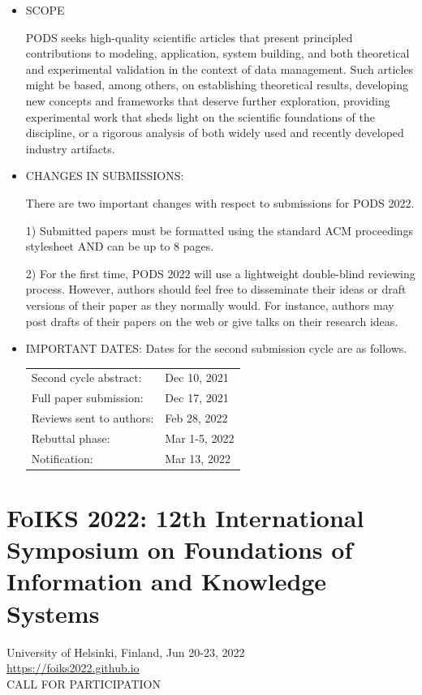 \documentclass[prodmode,acmtecs]{acmsmall} %
\begin{document}
\begin{itemize}\item  SCOPE  
 
  PODS seeks high-quality scientific articles that present principled contributions to modeling, application, system building, and both theoretical and experimental validation in the context of data management. Such articles might be based, among others, on establishing theoretical results, developing new concepts and frameworks that deserve further exploration, providing experimental work that sheds light on the scientific foundations of the discipline, or a rigorous analysis of both widely used and recently developed industry artifacts. 
 
\item  CHANGES IN SUBMISSIONS:  
 
  There are two important changes with respect to submissions for PODS 2022. 
 
  1) Submitted papers must be formatted using the standard ACM proceedings stylesheet AND can be up to 8 pages. 
 
  2) For the first time, PODS 2022 will use a lightweight double-blind reviewing process. However, authors should feel free to disseminate their ideas or draft versions of their paper as they normally would. For instance, authors may post drafts of their papers on the web or give talks on their research ideas. 
 
\item  IMPORTANT DATES: Dates for the second submission cycle are as follows. 
 
\begin{tabulary}{\linewidth}{LL}Second cycle abstract:  & Dec 10, 2021 \\
Full paper submission:  & Dec 17, 2021 \\
Reviews sent to authors:  & Feb 28, 2022 \\
Rebuttal phase:  & Mar 1-5, 2022 \\
Notification:  & Mar 13, 2022 \\
\end{tabulary}
 
\end{itemize}\section{FoIKS 2022: 12th International Symposium on Foundations of Information and Knowledge Systems}\label{FoIKS2022}  University of Helsinki, Finland, Jun 20-23, 2022\\ 
  \href{https://foiks2022.github.io}{https://foiks2022.github.io}\\ 
CALL FOR PARTICIPATION 
\end{document}
